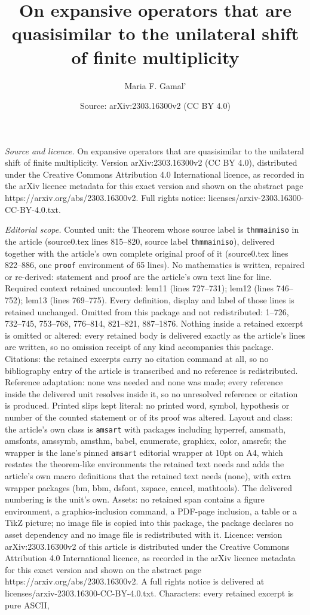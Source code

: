 \documentclass[10pt,a4paper]{amsart}
\title[On expansive operators that are quasisimilar to the unilater]{On expansive operators that are quasisimilar to the unilateral shift of finite multiplicity}
\author{Maria F. Gamal'}
\date{Source: arXiv:2303.16300v2 (CC BY 4.0)}
\begin{document}
\maketitle

\noindent\emph{Source and licence.} On expansive operators that are quasisimilar to the unilateral shift of finite multiplicity. Version arXiv:2303.16300v2 (CC BY 4.0), distributed under the Creative Commons Attribution 4.0 International licence, as recorded in the arXiv licence metadata for this exact version and shown on the abstract page https://arxiv.org/abs/2303.16300v2. Full rights notice: licenses/arxiv-2303.16300-CC-BY-4.0.txt.\par\smallskip

\noindent\textit{Editorial scope.} Counted unit: the Theorem whose source label is \texttt{thmmainiso} in the article (source0.tex lines 815--820, source label \texttt{thmmainiso}), delivered together with the article's own complete original proof of it (source0.tex lines 822--886, one \texttt{proof} environment of 65 lines). No mathematics is written, repaired or re-derived: statement and proof are the article's own text line for line. Required context retained uncounted: lem11 (lines 727--731); lem12 (lines 746--752); lem13 (lines 769--775). Every definition, display and label of those lines is retained unchanged. Omitted from this package and not redistributed: 1--726, 732--745, 753--768, 776--814, 821--821, 887--1876. Nothing inside a retained excerpt is omitted or altered: every retained body is delivered exactly as the article's lines are written, so no omission receipt of any kind accompanies this package. Citations: the retained excerpts carry no citation command at all, so no bibliography entry of the article is transcribed and no reference is redistributed. Reference adaptation: none was needed and none was made; every reference inside the delivered unit resolves inside it, so no unresolved reference or citation is produced. Printed slips kept literal: no printed word, symbol, hypothesis or number of the counted statement or of its proof was altered. Layout and class: the article's own class is \texttt{amsart} with packages including hyperref, amsmath, amsfonts, amssymb, amsthm, babel, enumerate, graphicx, color, amsrefs; the wrapper is the lane's pinned \texttt{amsart} editorial wrapper at 10pt on A4, which restates the theorem-like environments the retained text needs and adds the article's own macro definitions that the retained text needs (none), with extra wrapper packages (bm, bbm, dsfont, xspace, cancel, mathtools). The delivered numbering is the unit's own. Assets: no retained span contains a figure environment, a graphics-inclusion command, a PDF-page inclusion, a table or a TikZ picture; no image file is copied into this package, the package declares no asset dependency and no image file is redistributed with it. Licence: version arXiv:2303.16300v2 of this article is distributed under the Creative Commons Attribution 4.0 International licence, as recorded in the arXiv licence metadata for this exact version and shown on the abstract page https://arxiv.org/abs/2303.16300v2. A full rights notice is delivered at licenses/arxiv-2303.16300-CC-BY-4.0.txt. Characters: every retained excerpt is pure ASCII, 
\end{document}
